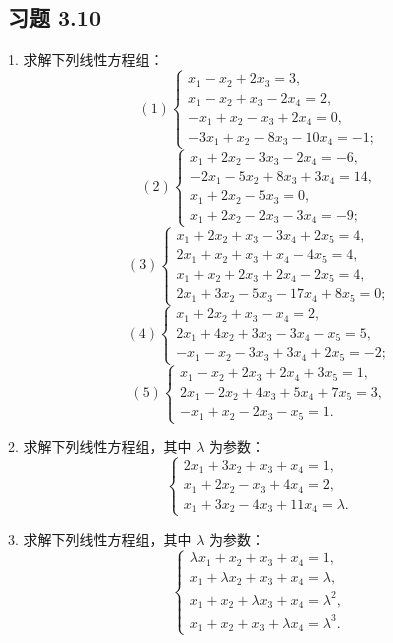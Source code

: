 \documentclass[UTF8, 12pt, fontset=fandol, oneside]{ctexart}
\begin{document}
\subsection*{习题 3.10}

1. 求解下列线性方程组：
\[
(1)\left\{\begin{array}{r}
x_1-x_2+2x_3=3,\\
x_1-x_2+x_3-2x_4=2,\\
-x_1+x_2-x_3+2x_4=0,\\
-3x_1+x_2-8x_3-10x_4=-1;
\end{array}\right.
\]
\[
(2)\left\{\begin{array}{r}
x_1+2x_2-3x_3-2x_4=-6,\\
-2x_1-5x_2+8x_3+3x_4=14,\\
x_1+2x_2-5x_3=0,\\
x_1+2x_2-2x_3-3x_4=-9;
\end{array}\right.
\]
\[
(3)\left\{\begin{array}{r}
x_1+2x_2+x_3-3x_4+2x_5=4,\\
2x_1+x_2+x_3+x_4-4x_5=4,\\
x_1+x_2+2x_3+2x_4-2x_5=4,\\
2x_1+3x_2-5x_3-17x_4+8x_5=0;
\end{array}\right.
\]
\[
(4)\left\{\begin{array}{r}
x_1+2x_2+x_3-x_4=2,\\
2x_1+4x_2+3x_3-3x_4-x_5=5,\\
-x_1-x_2-3x_3+3x_4+2x_5=-2;
\end{array}\right.
\]
\[
(5)\left\{\begin{array}{r}
x_1-x_2+2x_3+2x_4+3x_5=1,\\
2x_1-2x_2+4x_3+5x_4+7x_5=3,\\
-x_1+x_2-2x_3-x_5=1.
\end{array}\right.
\]

2. 求解下列线性方程组，其中 $\lambda$ 为参数：
\[
\left\{\begin{array}{r}
2x_1+3x_2+x_3+x_4=1,\\
x_1+2x_2-x_3+4x_4=2,\\
x_1+3x_2-4x_3+11x_4=\lambda.
\end{array}\right.
\]

3. 求解下列线性方程组，其中 $\lambda$ 为参数：
\[
\left\{\begin{array}{r}
\lambda x_1+x_2+x_3+x_4=1,\\
x_1+\lambda x_2+x_3+x_4=\lambda,\\
x_1+x_2+\lambda x_3+x_4=\lambda^2,\\
x_1+x_2+x_3+\lambda x_4=\lambda^3.
\end{array}\right.
\]
\end{document}
